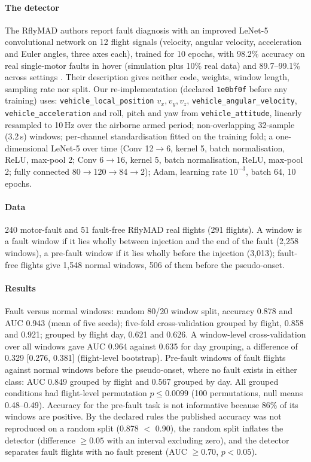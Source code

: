 \documentclass[preprint,12pt]{elsarticle}
\begin{document}
\paragraph{The detector} The RflyMAD authors report fault diagnosis with an improved LeNet-5 convolutional network on 12 flight signals (velocity, angular velocity, acceleration and Euler angles, three axes each), trained for 10 epochs, with 98.2\% accuracy on real single-motor faults in hover (simulation plus 10\% real data) and 89.7--99.1\% across settings \cite{le2025rflymad}. Their description gives neither code, weights, window length, sampling rate nor split. Our re-implementation (declared \texttt{1e0bf0f} before any training) uses: \texttt{vehicle\_local\_position} $v_x, v_y, v_z$, \texttt{vehicle\_angular\_velocity}, \texttt{vehicle\_acceleration} and roll, pitch and yaw from \texttt{vehicle\_attitude}, linearly resampled to 10\,Hz over the airborne armed period; non-overlapping 32-sample (3.2\,s) windows; per-channel standardisation fitted on the training fold; a one-dimensional LeNet-5 over time (Conv 12$\to$6, kernel 5, batch normalisation, ReLU, max-pool 2; Conv 6$\to$16, kernel 5, batch normalisation, ReLU, max-pool 2; fully connected 80$\to$120$\to$84$\to$2); Adam, learning rate $10^{-3}$, batch 64, 10 epochs.
\paragraph{Data} 240 motor-fault and 51 fault-free RflyMAD real flights (291 flights). A window is a fault window if it lies wholly between injection and the end of the fault (2,258 windows), a pre-fault window if it lies wholly before the injection (3,013); fault-free flights give 1,548 normal windows, 506 of them before the pseudo-onset.
\paragraph{Results} Fault versus normal windows: random 80/20 window split, accuracy 0.878 and AUC 0.943 (mean of five seeds); five-fold cross-validation grouped by flight, 0.858 and 0.921; grouped by flight day, 0.621 and 0.626. A window-level cross-validation over all windows gave AUC 0.964 against 0.635 for day grouping, a difference of 0.329 [0.276, 0.381] (flight-level bootstrap). Pre-fault windows of fault flights against normal windows before the pseudo-onset, where no fault exists in either class: AUC 0.849 grouped by flight and 0.567 grouped by day. All grouped conditions had flight-level permutation $p\le0.0099$ (100 permutations, null means 0.48--0.49). Accuracy for the pre-fault task is not informative because 86\% of its windows are positive. By the declared rules the published accuracy was not reproduced on a random split (0.878 $<$ 0.90), the random split inflates the detector (difference $\ge 0.05$ with an interval excluding zero), and the detector separates fault flights with no fault present (AUC $\ge 0.70$, $p<0.05$).
\end{document}
